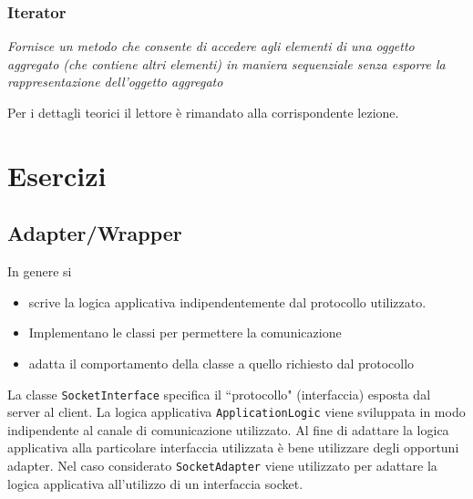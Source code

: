\documentclass{article}
\begin{document}
\subsubsection{Iterator}
\begin{framed}
\emph{Fornisce un metodo che consente di accedere agli elementi di una oggetto aggregato (che contiene altri elementi) in maniera sequenziale senza esporre la rappresentazione dell'oggetto aggregato}
\end{framed}
Per i dettagli teorici il lettore \`e rimandato alla corrispondente lezione.
\clearpage
\section{Esercizi}




\subsection{Adapter/Wrapper}

In genere si
\begin{itemize}
\item scrive la logica applicativa indipendentemente dal protocollo utilizzato. 
\item Implementano le classi per permettere la comunicazione
\item adatta il comportamento della classe a quello richiesto dal protocollo
\end{itemize} 

La classe \texttt{SocketInterface} specifica il ``protocollo" (interfaccia) esposta dal server al client. La logica applicativa \texttt{ApplicationLogic} viene sviluppata in modo indipendente al canale di comunicazione utilizzato. Al fine di adattare la logica applicativa alla particolare interfaccia utilizzata \`e bene utilizzare degli opportuni adapter. Nel caso considerato \texttt{SocketAdapter} viene utilizzato per adattare la logica applicativa all'utilizzo di un interfaccia socket.
\end{document}

